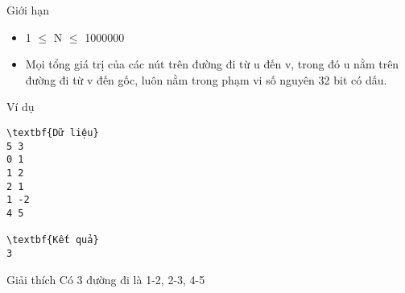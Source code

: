 Giới hạn
\begin{itemize}
	\item     1  $\le$  N  $\le$  1000000   
	\item     Mọi tổng giá trị của các nút trên đường đi từ u đến v, trong đó u nằm trên đường đi từ v đến gốc, luôn nằm trong phạm vi số nguyên 32 bit có dấu.   
\end{itemize}
Ví dụ
\begin{verbatim}
\textbf{Dữ liệu}
5 3
0 1
1 2
2 1
1 -2
4 5

\textbf{Kết quả}
3
\end{verbatim}
Giải thích
Có 3 đường đi là 1-2, 2-3, 4-5